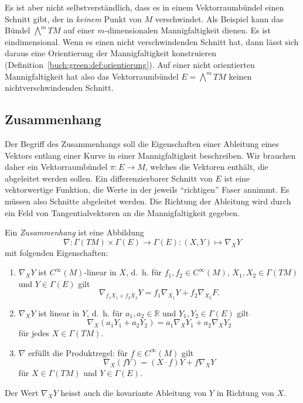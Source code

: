 Es ist aber nicht selbstverständlich, dass es in einem Vektorraumbündel
einen Schnitt gibt, der in \emph{keinem} Punkt von $M$ verschwindet.
Als Beispiel kann das Bündel $\bigwedge^mTM$ auf einer $m$-dimensionalen
Mannigfaltigkeit dienen.
Es ist eindimensional.
Wenn es einen nicht verschwindenden Schnitt hat, dann lässt sich daraus
eine Orientierung der Mannigfaltigkeit konstruieren
(Definition~\ref{buch:green:def:orientierung}).
Auf einer nicht orientierten Mannigfaltigkeit hat also das Vektorraumbündel
$E=\bigwedge^m TM$ keinen nichtverschwindenden Schnitt.


%
%
\subsection{Zusammenhang}
Der Begriff des Zusammenhangs soll die Eigenschaften einer Ableitung 
eines Vektors entlang einer Kurve in einer Mannigfaltigkeit beschreiben.
Wir brauchen daher ein Vektorraumbündel $\pi\colon E\to M$, welches
die Vektoren enthält, die abgeleitet werden sollen.
Ein differenzierbarer Schnitt von $E$ ist eine vektorwertige
Funktion, die Werte in der jeweils ``richtigen'' Faser annimmt.
Es müssen also Schnitte abgeleitet werden.
Die Richtung der Ableitung wird durch ein Feld von Tangentialvektoren
an die Mannigfaltigkeit gegeben.

\begin{definition}
Ein \emph{Zusammenhang} ist eine Abbildung
%
\[
\nabla 
\colon
\Gamma(TM)\times \Gamma(E) \to \Gamma(E)
:
(X,Y) \mapsto \nabla_X Y
\]
mit folgenden Eigenschaften:
\begin{enumerate}
\item $\nabla_X Y$ ist $C^\infty(M)$-linear in $X$, d.~h. für 
$f_1,f_2\in C^{\infty}(M)$, $X_1,X_2\in \Gamma(TM)$ und $Y\in\Gamma(E)$ gilt
\[
\nabla_{f_1X_1+f_2X_2}Y
=
f_1\nabla_{X_1}Y + f_2\nabla_{X_2}F.
\]
\item $\nabla_X Y$ ist linear in $Y$, d.~h. für $a_1,a_2\in\mathbb{R}$
und $Y_1,Y_2\in \Gamma(E)$ gilt
\[
\nabla_X(a_1Y_1+a_2Y_2)
=
a_1\nabla_XY_1
+
a_2\nabla_XY_2
\]
für jedes $X\in\Gamma(TM)$.
\item
$\nabla$ erfüllt die Produktregel: für $f\in C^\infty(M)$ gilt
%
\[
\nabla_X (fY)
=
(X\cdot f)Y + f\nabla_X Y
\]
für $X\in\Gamma(TM)$ und $Y\in\Gamma(E)$.
\end{enumerate}
Der Wert $\nabla_XY$ heisst auch die kovariante Ableitung von $Y$
in Richtung von $X$.
\end{definition}



